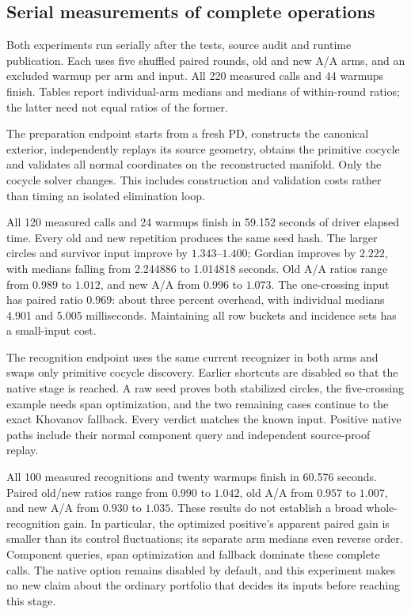 \subsection{Serial measurements of complete operations}

Both experiments run serially after the tests, source audit and runtime
publication. Each uses five shuffled paired rounds, old and new A/A arms,
and an excluded warmup per arm and input. All 220 measured calls and
44 warmups finish. Tables report individual-arm medians and medians of
within-round ratios; the latter need not equal ratios of the former.

The preparation endpoint starts from a fresh PD, constructs the canonical
exterior, independently replays its source geometry, obtains the primitive
cocycle and validates all normal coordinates on the reconstructed manifold.
Only the cocycle solver changes. This includes construction and validation
costs rather than timing an isolated elimination loop.

\begin{center}
\small

\end{center}

All 120 measured calls and 24 warmups finish in 59.152 seconds of driver
elapsed time. Every old and new repetition produces the same seed hash.
The larger circles and survivor input improve by $1.343$--$1.400$; Gordian
improves by $2.222$, with medians falling from 2.244886 to 1.014818 seconds.
Old A/A ratios range from $0.989$ to $1.012$, and new A/A from $0.996$ to
$1.073$. The one-crossing input has paired ratio $0.969$: about three
percent overhead, with individual medians 4.901 and 5.005 milliseconds.
Maintaining all row buckets and incidence sets has a small-input cost.

The recognition endpoint uses the same current recognizer in both arms
and swaps only primitive cocycle discovery. Earlier shortcuts are disabled
so that the native stage is reached. A raw seed proves both stabilized
circles, the five-crossing example needs span optimization, and the two
remaining cases continue to the exact Khovanov fallback. Every verdict
matches the known input. Positive native paths include their normal
component query and independent source-proof replay.

\begin{center}
\small

\end{center}

All 100 measured recognitions and twenty warmups finish in 60.576 seconds.
Paired old/new ratios range from $0.990$ to $1.042$, old A/A from $0.957$
to $1.007$, and new A/A from $0.930$ to $1.035$. These results do not
establish a broad whole-recognition gain. In particular, the optimized
positive's apparent paired gain is smaller than its control fluctuations;
its separate arm medians even reverse order. Component queries, span
optimization and fallback dominate these complete calls. The native option
remains disabled by default, and this experiment makes no new claim about
the ordinary portfolio that decides its inputs before reaching this stage.

